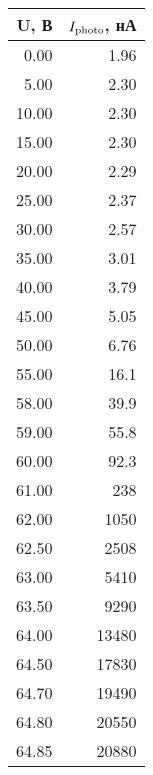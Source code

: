 
\begin{tabular}{rr}
\toprule
    U, В &        $I_{\textnormal{photo}}$,  нА\\
\midrule
 0.00 &     1.96 \\
 5.00 &     2.30 \\
10.00 &     2.30 \\
15.00 &     2.30 \\
20.00 &     2.29 \\
25.00 &     2.37 \\
30.00 &     2.57 \\
35.00 &     3.01 \\
40.00 &     3.79 \\
45.00 &     5.05 \\
50.00 &     6.76 \\
55.00 &     16.1 \\
58.00 &     39.9 \\
59.00 &     55.8 \\
60.00 &     92.3 \\
61.00 &      238 \\
62.00 &     1050 \\
62.50 &     2508 \\
63.00 &     5410 \\
63.50 &     9290 \\
64.00 &    13480 \\
64.50 &    17830 \\
64.70 &    19490 \\
64.80 &    20550 \\
64.85 &    20880 \\
\bottomrule
\end{tabular}
